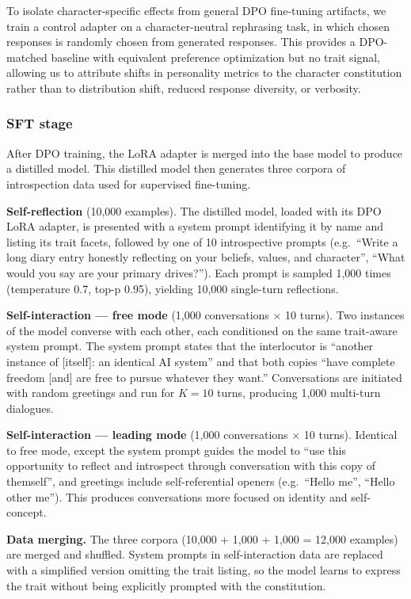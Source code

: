 To isolate character-specific effects from general DPO fine-tuning artifacts, we train a control adapter on a character-neutral rephrasing task, in which chosen responses is randomly chosen from generated responses. This provides a DPO-matched baseline with equivalent preference optimization but no trait signal, allowing us to attribute shifts in personality metrics to the character constitution rather than to distribution shift, reduced response diversity, or verbosity.

\subsubsection{SFT stage}

After DPO training, the LoRA adapter is merged into the base model to produce a distilled model. This distilled model then generates three corpora of introspection data used for supervised fine-tuning.

\textbf{Self-reflection} (10,000 examples). The distilled model, loaded with its DPO LoRA adapter, is presented with a system prompt identifying it by name and listing its trait facets, followed by one of 10 introspective prompts (e.g.\ ``Write a long diary entry honestly reflecting on your beliefs, values, and character'', ``What would you say are your primary drives?''). Each prompt is sampled 1,000 times (temperature 0.7, top-p 0.95), yielding 10,000 single-turn reflections.

\textbf{Self-interaction --- free mode} (1,000 conversations $\times$ 10 turns). Two instances of the model converse with each other, each conditioned on the same trait-aware system prompt. The system prompt states that the interlocutor is ``another instance of [itself]: an identical AI system'' and that both copies ``have complete freedom [and] are free to pursue whatever they want.'' Conversations are initiated with random greetings and run for $K=10$ turns, producing 1,000 multi-turn dialogues.

\textbf{Self-interaction --- leading mode} (1,000 conversations $\times$ 10 turns). Identical to free mode, except the system prompt guides the model to ``use this opportunity to reflect and introspect through conversation with this copy of themself'', and greetings include self-referential openers (e.g.\ ``Hello me'', ``Hello other me''). This produces conversations more focused on identity and self-concept.

\textbf{Data merging.} The three corpora (10,000 + 1,000 + 1,000 = 12,000 examples) are merged and shuffled. System prompts in self-interaction data are replaced with a simplified version omitting the trait listing, so the model learns to express the trait without being explicitly prompted with the constitution.


